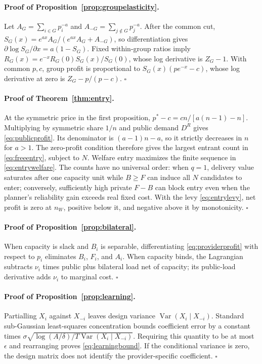 \documentclass[sigconf,nonacm]{acmart}
\newcommand{\1}{\mathbf 1}
\begin{document}
\paragraph{Proof of Proposition~\ref{prop:groupelasticity}.}
Let $A_G=\sum_{i\in G}p_i^{-a}$ and
$A_{-G}=\sum_{j\notin G}p_j^{-a}$.  After the common cut,
$S_G(x)=e^{ax}A_G/(e^{ax}A_G+A_{-G})$, so differentiation gives
$\partial\log S_G/\partial x=a(1-S_G)$.  Fixed within-group ratios imply
$R_G(x)=e^{-x}R_G(0)S_G(x)/S_G(0)$, whose log derivative is $Z_G-1$.
With common $p,c$, group profit is proportional to
$S_G(x)(pe^{-x}-c)$, whose log derivative at zero is
$Z_G-p/(p-c)$. \hfill$\square$

\paragraph{Proof of Theorem~\ref{thm:entry}.}
At the symmetric price in the first proposition,
$p^*-c=cn/[a(n-1)-n]$.  Multiplying by symmetric share $1/n$ and
public demand $D^R$ gives \eqref{eq:publicprofit}.  Its denominator is
$(a-1)n-a$, so it strictly decreases in $n$ for $a>1$.  The zero-profit
condition therefore gives the largest entrant count in \eqref{eq:freeentry},
subject to $N$.  Welfare entry maximizes the finite sequence in
\eqref{eq:entrywelfare}.  The counts have no universal order: when $q=1$,
delivery value saturates after one capacity unit while $B\ge F$ can induce all
$N$ candidates to enter; conversely, sufficiently high private $F-B$ can block
entry even when the planner's reliability gain exceeds real fixed cost.  With
the levy \eqref{eq:entrylevy}, net profit is zero at $n_W$, positive below it,
and negative above it by monotonicity. \hfill$\square$

\paragraph{Proof of Proposition~\ref{prop:bilateral}.}
When capacity is slack and $B_i$ is separable, differentiating
\eqref{eq:providerprofit} with respect to $p_i$ eliminates $B_i$, $F_i$, and
$A_i$.  When capacity binds, the Lagrangian subtracts $\nu_i$ times public plus
bilateral load net of capacity; its public-load derivative adds $\nu_i$ to
marginal cost. \hfill$\square$

\paragraph{Proof of Proposition~\ref{prop:learning}.}
Partialling $X_i$ against $X_{-i}$ leaves design variance
$\operatorname{Var}(X_i\mid X_{-i})$.  Standard sub-Gaussian least-squares
concentration bounds coefficient error by a constant times
$\sigma\sqrt{\log(A/\delta)/{T\operatorname{Var}(X_i\mid X_{-i})}}$.
Requiring this quantity to be at most $\epsilon$ and rearranging proves
\eqref{eq:learningbound}.  If the conditional variance is zero, the design
matrix does not identify the provider-specific coefficient. \hfill$\square$
\end{document}
